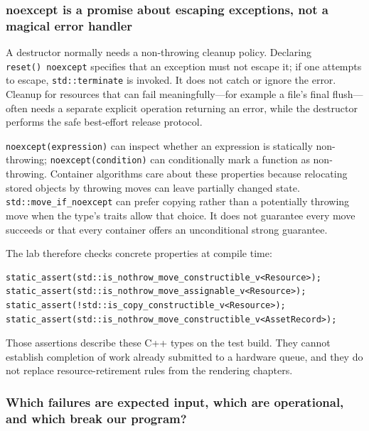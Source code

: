 \subsubsection{noexcept is a promise about escaping exceptions, not a magical error handler}\label{noexcept-is-a-promise-about-escaping-exceptions-not-a-magical-error-handler}

A destructor normally needs a non-throwing cleanup policy. Declaring \texttt{reset()\ noexcept} specifies that an exception must not escape it; if one attempts to escape, \texttt{std::terminate} is invoked. It does not catch or ignore the error. Cleanup for resources that can fail meaningfully---for example a file's final flush---often needs a separate explicit operation returning an error, while the destructor performs the safe best-effort release protocol.

\texttt{noexcept(expression)} can inspect whether an expression is statically non-throwing; \texttt{noexcept(condition)} can conditionally mark a function as non-throwing. Container algorithms care about these properties because relocating stored objects by throwing moves can leave partially changed state. \texttt{std::move\_if\_noexcept} can prefer copying rather than a potentially throwing move when the type's traits allow that choice. It does not guarantee every move succeeds or that every container offers an unconditional strong guarantee.

The lab therefore checks concrete properties at compile time:

\begin{verbatim}
static_assert(std::is_nothrow_move_constructible_v<Resource>);
static_assert(std::is_nothrow_move_assignable_v<Resource>);
static_assert(!std::is_copy_constructible_v<Resource>);
static_assert(std::is_nothrow_move_constructible_v<AssetRecord>);
\end{verbatim}

Those assertions describe these C++ types on the test build. They cannot establish completion of work already submitted to a hardware queue, and they do not replace resource-retirement rules from the rendering chapters.

\subsubsection{Which failures are expected input, which are operational, and which break our program?}\label{which-failures-are-expected-input-which-are-operational-and-which-break-our-program}

